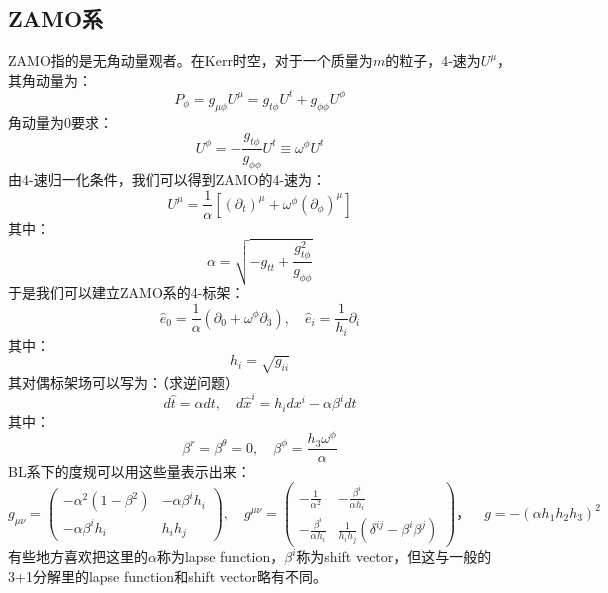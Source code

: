 \documentclass[lang=cn,color=blue,cm,11pt,scheme=chinese,bibend=bibtex,sorting=nty]{elegantbook}
\begin{document}
	\subsection{ZAMO系}
	
	ZAMO指的是无角动量观者。在Kerr时空，对于一个质量为$m$的粒子，4-速为$U^{\mu}$，其角动量为：
	\begin{equation}
		P_{\phi} = g_{\mu \phi} U^{\mu} = g_{t \phi} U^t + g_{\phi \phi} U^{\phi}
	\end{equation}
	角动量为0要求：
	\begin{equation}
		U^{\phi} = - \frac{g_{t \phi}}{g_{\phi \phi}} U^t \equiv \omega^{\phi} U^t
	\end{equation}
	由4-速归一化条件，我们可以得到ZAMO的4-速为：
	\begin{equation}
		U^{\mu} = \frac{1}{\alpha} [(\partial_t)^{\mu} + \omega^{\phi} (\partial_{\phi})^{\mu}]
	\end{equation}
	其中：
	\begin{equation}
		\alpha = \sqrt{- g_{tt} + \frac{g^2_{t \phi}}{g_{\phi \phi}}}
	\end{equation}
	于是我们可以建立ZAMO系的4-标架：
	\begin{equation}
		\hat{e}_0 = \frac{1}{\alpha} (\partial_0 + \omega^{\phi} \partial_3), \quad
		\hat{e}_i = \frac{1}{h_i} \partial_i
	\end{equation}
	其中：
	\begin{equation}
		h_i = \sqrt{g_{i i}}
	\end{equation}
	其对偶标架场可以写为：（求逆问题）
	\begin{equation}
		d \hat{t} = \alpha d t, \quad d \hat{x}^i = h_i d x^i - \alpha \beta^i d t
	\end{equation}
	其中：
	\begin{equation}
		\beta^r = \beta^{\theta} = 0, \quad \beta^{\phi} = \frac{h_3 \omega^{\phi}}{\alpha}
	\end{equation}
	BL系下的度规可以用这些量表示出来：
	\begin{equation}
		g_{\mu \nu} = \begin{pmatrix}
			- \alpha^2 (1 - \beta^2) & - \alpha \beta^i h_i\\
			- \alpha \beta^i h_i & h_i h_j
		\end{pmatrix}, \quad g^{\mu \nu} = \begin{pmatrix}
			- \frac{1}{\alpha^2} & - \frac{\beta^i}{\alpha h_i}\\
			- \frac{\beta^i}{\alpha h_i} & \frac{1}{h_i h_j} (\delta^{i j} - \beta^i \beta^j)
		\end{pmatrix} ， \quad g = - (\alpha h_1 h_2 h_3)^2
	\end{equation}
	有些地方喜欢把这里的$\alpha$称为lapse function，$\beta^i$称为shift vector，但这与一般的3+1分解里的lapse function和shift vector略有不同。
	
\end{document}
